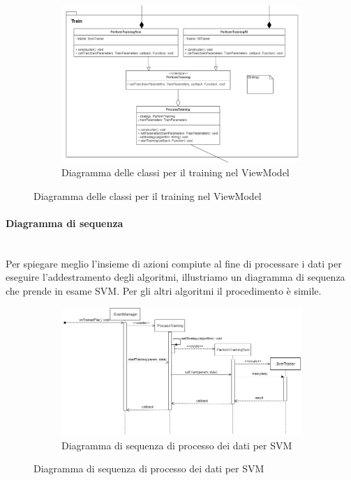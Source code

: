 		\begin{landscape}
			\begin{figure}
				\begin{figure} [H]
					\includegraphics[width=\linewidth]{img/Diagrammi/ViewModel-train-app.png}
					\caption{Diagramma delle classi per il training nel ViewModel}
				\end{figure}
			\end{figure}
		\end{landscape}
		\paragraph*{Diagramma di sequenza} \mbox{} \\[1mm]
		Per spiegare meglio l'insieme di azioni compiute al fine di processare i dati per eseguire l'addestramento degli algoritmi, illustriamo un diagramma di sequenza che prende in esame SVM\glo. Per gli altri algoritmi il procedimento è simile.
		\mbox{}
		\begin{landscape}
			\begin{figure}
				\begin{figure} [H]
					\includegraphics[width=\linewidth]{img/Diagrammi/ds-app.png}
					\caption{Diagramma di sequenza di processo dei dati per SVM}
				\end{figure}
			\end{figure}
		\end{landscape}
